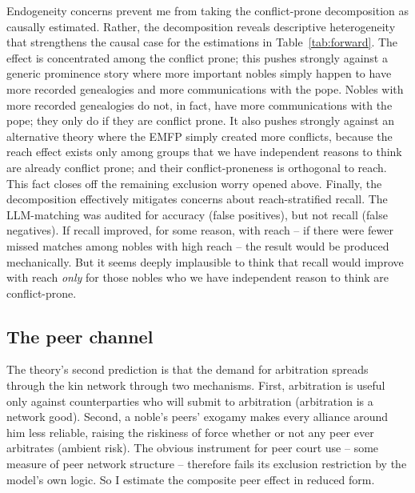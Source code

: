 \documentclass[12pt]{article}
\theoremstyle{definition}
\theoremstyle{remark}
\begin{document}
Endogeneity concerns prevent me from taking the conflict-prone decomposition as causally estimated. Rather, the decomposition reveals descriptive heterogeneity that strengthens the causal case for the estimations in Table~\ref{tab:forward}. The effect is concentrated among the conflict prone; this pushes strongly against a generic prominence story where more important nobles simply happen to have more recorded genealogies and more communications with the pope. Nobles with more recorded genealogies do not, in fact, have more communications with the pope; they only do if they are conflict prone. It also pushes strongly against an alternative theory where the EMFP simply created more conflicts, because the reach effect exists only among groups that we have independent reasons to think are already conflict prone; and their conflict-proneness is orthogonal to reach. This fact closes off the remaining exclusion worry opened above. Finally, the decomposition effectively mitigates concerns about reach-stratified recall. The LLM-matching was audited for accuracy (false positives), but not recall (false negatives). If recall improved, for some reason, with reach -- if there were fewer missed matches among nobles with high reach -- the result would be produced mechanically. But it seems deeply implausible to think that recall would improve with reach \textit{only} for those nobles who we have independent reason to think are conflict-prone.

\subsection{The peer channel}
\label{sub:network}

The theory's second prediction is that the demand for arbitration spreads through the kin network through two mechanisms. First, arbitration is useful only against counterparties who will submit to arbitration (arbitration is a network good). Second, a noble's peers' exogamy makes every alliance around him less reliable, raising the riskiness of force whether or not any peer ever arbitrates (ambient risk). The obvious instrument for peer court use -- some measure of peer network structure -- therefore fails its exclusion restriction by the model's own logic. So I estimate the composite peer effect in reduced form.
\end{document}
